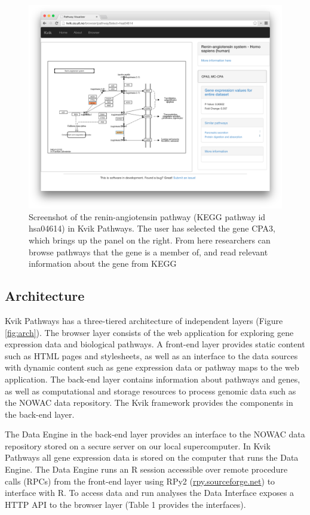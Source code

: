\begin{figure}[htb!]
    \begin{centering}
    \includegraphics[width=\textwidth]{figures/kvikpwfig.png}
    \caption{Screenshot of the renin-angiotensin pathway (KEGG pathway id
    hsa04614) in Kvik Pathways. The user has selected the gene CPA3, which brings 
    up the panel on the right. From here researchers can browse pathways that the
    gene is a member of, and read relevant information about the gene from KEGG} 
    \label{kvikpwfig}
    \end{centering} 
\end{figure}


\subsection{Architecture} 
Kvik Pathways has a three-tiered architecture of independent layers (Figure
\ref{fig:arch}). The browser layer consists of the web application for
exploring gene expression data and biological pathways. A front-end layer
provides static content such as HTML pages and stylesheets, as well as an
interface to the data sources with dynamic content such as gene expression
data or pathway maps to the web application. The back-end layer contains
information about pathways and genes, as well as computational and storage
resources to process genomic data such as the NOWAC data repository. The
Kvik framework provides the components in the back-end layer. 

The Data Engine in the back-end layer provides an interface to the NOWAC data
repository stored on a secure server on our local supercomputer. In Kvik
Pathways all gene expression data is stored on the computer that runs the Data
Engine. The Data Engine runs an R session accessible over remote procedure calls
(RPCs) from the front-end layer using RPy2
(\href{rpy.sourceforge.net}{rpy.sourceforge.net}) to interface with R. To access
data and run analyses the Data Interface exposes a HTTP API to the browser layer
(Table 1 provides the interfaces).


